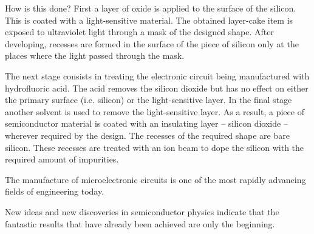 How is this done? First a layer of oxide is applied to the surface of the silicon. This is coated with a light-sensitive material. The obtained layer-cake item is exposed to ultraviolet light through a mask of the designed shape. After developing, recesses are formed in the surface of the piece of silicon only at the places where the light passed through the mask.

The next stage consists in treating the electronic circuit being manufactured with hydrofluoric acid. The acid removes the silicon dioxide but has no effect on either the primary surface (i.e. silicon) or the light-sensitive layer. In the final stage another solvent is used to remove the light-sensitive layer. As a result, a piece of semiconductor material is coated with an insulating layer -- silicon dioxide -- wherever required by the design. The recesses of the required shape are bare silicon. These recesses are treated with an ion beam to dope the silicon with the required amount of impurities.

The manufacture of microelectronic circuits is one of the most rapidly advancing fields of engineering today. 

New ideas and new discoveries in semiconductor physics indicate that the fantastic results that have already been achieved are only the beginning.
